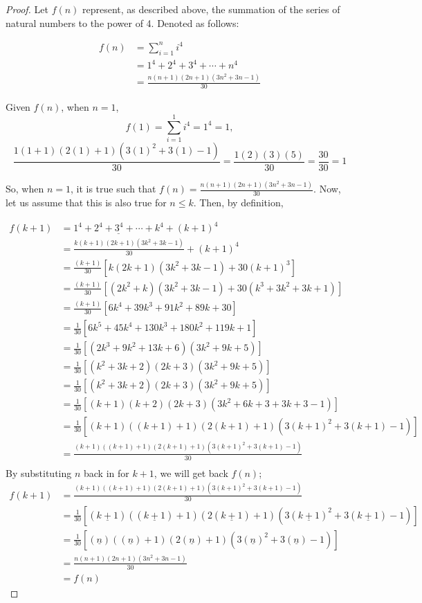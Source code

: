 \documentclass[11pt]{article}
\begin{document}
\begin{proof}
Let $f(n)$ represent, as described above, the summation of the series of natural numbers to the power of 4. Denoted as follows:

\begin{align*}
    f(n) & = \sum_{i=1}^{n}{i^4} \\
    & = 1^{4} + 2^{4} +3^{4} + \cdots + n^{4} \\
    & = \frac{n(n+1)(2n+1)(3n^{2}+3n-1)}{30}
\end{align*}

\noindent
Given $f(n)$, when $n=1$,
\[f(1) = \sum_{i=1}^{1}{i^4} = 1^4 = 1,\]
\[\frac{1(1+1)(2(1)+1)(3(1)^{2}+3(1)-1)}{30} = \frac{1(2)(3)(5)}{30} = \frac{30}{30} = 1\]

\noindent
So, when $n = 1$, it is true such that $f(n) = \frac{n(n+1)(2n+1)(3n^{2}+3n-1)}{30}$. Now, let us assume that this is also true for $n \le k$. Then, by definition,
\newline

\begin{align*}
    f(k+1) & = \underline{1^{4} + 2^{4} +3^{4} + \cdots + k^{4}} + (k+1)^4 \\
    & = \frac{k(k+1)(2k+1)(3k^{2}+3k-1)}{30} + (k+1)^4 \\
    & = \frac{(k+1)}{30} [ k(2k+1)(3k^{2} +3k - 1) + 30(k + 1)^{3} ] \\
    & = \frac{(k+1)}{30} [ ( 2k^{2} + k)(3k^{2} + 3k -1) + 30(k^{3} + 3k^{2} + 3k +1) ] \\
    & = \frac{(k+1)}{30} [ 6k^{4} + 39k^{3} + 91k^{2} + 89k + 30 ] \\
    & = \frac{1}{30} [ 6k^{5} + 45k^{4} + 130k^{3} + 180k^{2} + 119k + 1 ] \\
    & = \frac{1}{30} [ (2k^{3} + 9k^{2} + 13k +6)( 3k^{2} + 9k + 5) ] \\
    & = \frac{1}{30} [ ( k^{2} + 3k + 2 )( 2k + 3 )( 3k^{2} + 9k + 5) ] \\
    & = \frac{1}{30} [ ( k^{2} + 3k + 2 )( 2k + 3 )( 3k^{2} + 9k + 5) ] \\
    & = \frac{1}{30} [ (k+1)(k+2)( 2k + 3 )( 3k^{2} + 6k + 3 + 3k + 3 - 1) ] \\
    & = \frac{1}{30} [ (k+1)((k+1)+1)( 2(k+1)+1 )(3(k+1)^{2} + 3(k+1) - 1) ] \\
    & = \frac{(k+1)((k+1)+1)( 2(k+1)+1 )(3(k+1)^{2} + 3(k+1) - 1)}{30} \\
\end{align*}
\noindent By substituting $n$ back in for $k+1$, we will get back $f(n)$;
\begin{align*}
    f(k+1) & = \frac{(k+1)((k+1)+1)( 2(k+1)+1 )(3(k+1)^{2} + 3(k+1) - 1)}{30} \\
    & = \frac{1}{30}[(\underline{k+1})((\underline{k+1})+1)( 2(\underline{k+1})+1 )(3(\underline{k+1})^{2} + 3(\underline{k+1}) - 1)] \\
    & = \frac{1}{30}[(\underline{n})((\underline{n})+1)( 2(\underline{n})+1 )(3(\underline{n})^{2} + 3(\underline{n}) - 1)] \\
    & = \frac{n(n+1)(2n+1)(3n^{2}+3n-1)}{30} \\
    & = f(n)
\end{align*}


\end{proof}
\end{document}
